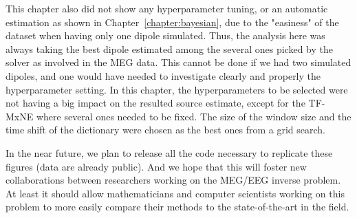 This chapter also did not show any hyperparameter tuning, or an automatic estimation as shown in Chapter~\ref{chapter:bayesian}, due to the "easiness" of the dataset when having only one dipole simulated. Thus, the analysis here was always taking the best dipole estimated among the several ones picked by the solver as involved in the MEG data. This cannot be done if we had two simulated dipoles, and one would have needed to investigate clearly and properly the hyperparameter setting. In this chapter, the hyperparameters to be selected were not having a big impact on the resulted source estimate, except for the TF-MxNE where several ones needed to be fixed. The size of the window size and the time shift of the dictionary were chosen as the best ones from a grid search.

In the near future, we plan to release all the code necessary to replicate these figures (data are already public). And we hope that this will foster new collaborations between researchers working on the MEG/EEG inverse problem. At least it should allow mathematicians and computer scientists working on this problem to more easily compare their methods to the state-of-the-art in the field.
